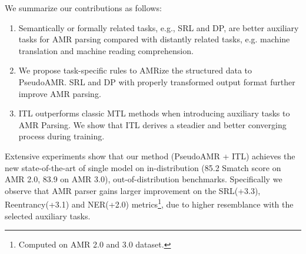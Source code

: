 \documentclass[11pt]{article}
\begin{document}
We summarize our contributions as follows: 
\begin{enumerate}
    \item Semantically or formally related tasks, e.g., SRL and DP, are better auxiliary tasks for AMR parsing compared with distantly related tasks, e.g. machine translation and machine reading comprehension.
\item We propose task-specific rules to  AMRize the structured data to PseudoAMR. SRL and DP with properly transformed output format further improve AMR parsing. \item ITL outperforms classic MTL methods when introducing auxiliary tasks to AMR Parsing. We show that ITL derives a steadier and better converging process during training.
\end{enumerate}

  Extensive experiments show that our method (PseudoAMR + ITL) achieves the new state-of-the-art of single model on in-distribution (85.2 Smatch score on AMR 2.0, 83.9 on AMR 3.0), out-of-distribution benchmarks. Specifically we observe that AMR parser gains larger improvement on the SRL(+3.3), Reentrancy(+3.1) and NER(+2.0) metrics\footnote{Computed on AMR 2.0 and 3.0 dataset.}, due to higher resemblance with the selected auxiliary tasks.  
\end{document}
